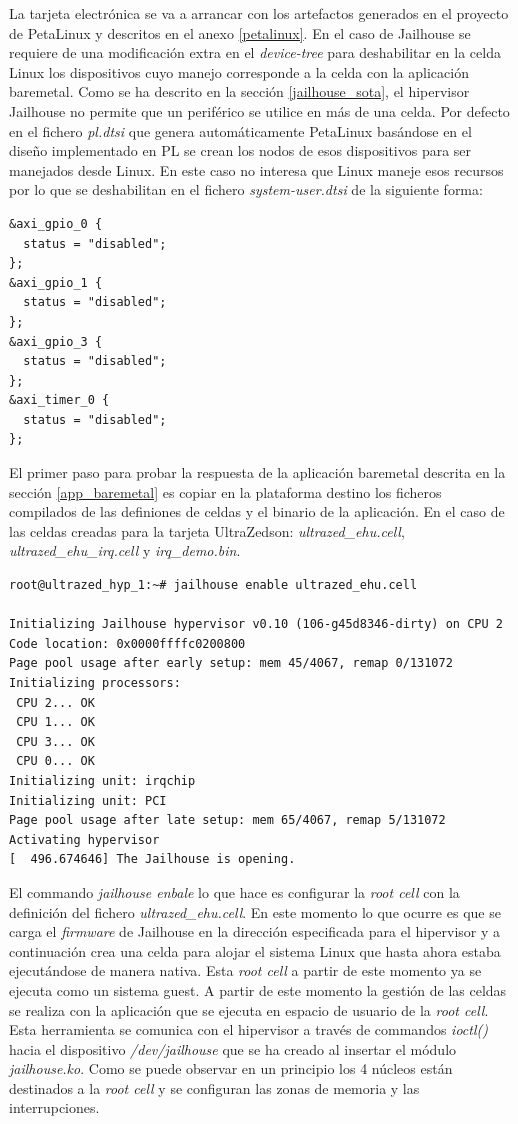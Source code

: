 La tarjeta electrónica se va a arrancar con los artefactos generados en el proyecto de PetaLinux y descritos en el anexo \ref{petalinux}. En el caso de Jailhouse se requiere de una modificación extra en el \textit{device-tree} para deshabilitar en la celda Linux los dispositivos cuyo manejo corresponde a la celda con la aplicación baremetal. Como se ha descrito en la sección \ref{jailhouse_sota}, el hipervisor Jailhouse no permite que un periférico se utilice en más de una celda. Por defecto en el fichero \textit{pl.dtsi} que genera automáticamente PetaLinux basándose en el diseño implementado en \acrshort{PL} se crean los nodos de esos dispositivos para ser manejados desde Linux. En este caso no interesa que Linux maneje esos recursos por lo que se deshabilitan en el fichero \textit{system-user.dtsi} de la siguiente forma:
\begin{lstlisting}[style=CStyle]
&axi_gpio_0 {
  status = "disabled";
};
&axi_gpio_1 {
  status = "disabled";
};
&axi_gpio_3 {
  status = "disabled";
};
&axi_timer_0 {
  status = "disabled";
};
\end{lstlisting}

El primer paso para probar la respuesta de la aplicación baremetal descrita en la sección \ref{app_baremetal} es copiar en la plataforma destino los ficheros compilados de las definiones de celdas y el binario de la aplicación. En el caso de las celdas creadas para la tarjeta UltraZed\texttrademark son: \textit{ultrazed\_ehu.cell}, \textit{ultrazed\_ehu\_irq.cell} y \textit{irq\_demo.bin}.

\begin{lstlisting}[style=CStyle]
root@ultrazed_hyp_1:~# jailhouse enable ultrazed_ehu.cell

Initializing Jailhouse hypervisor v0.10 (106-g45d8346-dirty) on CPU 2
Code location: 0x0000ffffc0200800
Page pool usage after early setup: mem 45/4067, remap 0/131072
Initializing processors:
 CPU 2... OK
 CPU 1... OK
 CPU 3... OK
 CPU 0... OK
Initializing unit: irqchip
Initializing unit: PCI
Page pool usage after late setup: mem 65/4067, remap 5/131072
Activating hypervisor
[  496.674646] The Jailhouse is opening.
\end{lstlisting}

El commando \textit{jailhouse enbale} lo que hace es configurar la \textit{root cell} con la definición del fichero \textit{ultrazed\_ehu.cell}. En este momento lo que ocurre es que se carga el \textit{firmware} de Jailhouse en la dirección especificada para el hipervisor y a continuación crea una celda para alojar el sistema Linux que hasta ahora estaba ejecutándose de manera nativa. Esta \textit{root cell} a partir de este momento ya se ejecuta como un sistema guest. A partir de este momento la gestión de las celdas se realiza con la aplicación que se ejecuta en espacio de usuario de la \textit{root cell}. Esta herramienta se comunica con el hipervisor a través de commandos \textit{ioctl()} hacia el dispositivo \textit{/dev/jailhouse} que se ha creado al insertar el módulo \textit{jailhouse.ko}.
Como se puede observar en un principio los 4 núcleos están destinados a la \textit{root cell} y se configuran las zonas de memoria y las interrupciones.\\

